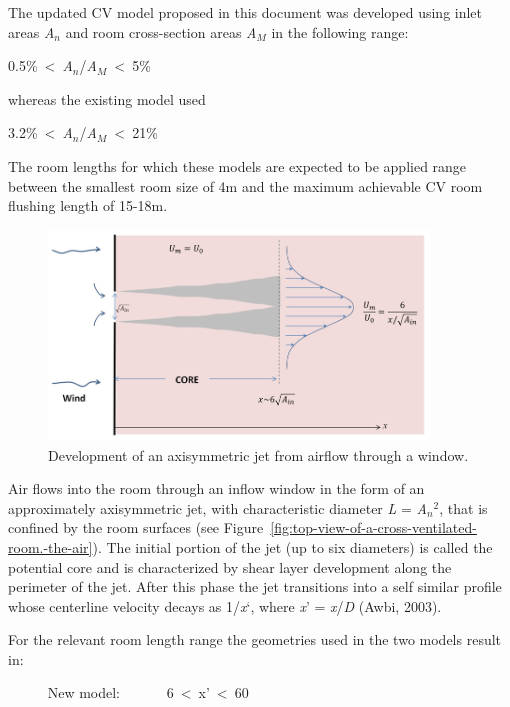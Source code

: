 The updated CV model proposed in this document was developed using inlet areas \emph{A}\(_{n}\) and room cross-section areas \emph{A}\(_{M}\) in the following range:

0.5\%~\textless{}~\emph{A}\(_{n}\)/\emph{A}\(_{M}\)~\textless{}~5\%

whereas the existing model used

3.2\%~\textless{}~\emph{A}\(_{n}\)/\emph{A}\(_{M}\)~\textless{}~21\%

The room lengths for which these models are expected to be applied range between the smallest room size of 4m and the maximum achievable CV room flushing length of 15-18m.

\begin{figure}[hbtp] %
\centering
\includegraphics[width=0.9\textwidth, height=0.9\textheight, keepaspectratio=true]{media/image2622.png}
\caption{Development of an axisymmetric jet from airflow through a window. \protect \label{fig:development-of-an-axisymmetric-jet-from}}
\end{figure}

Air flows into the room through an inflow window in the form of an approximately axisymmetric jet, with characteristic diameter \emph{L} = \emph{A}\(_{n}\)\(^{2}\), that is confined by the room surfaces (see Figure~\ref{fig:top-view-of-a-cross-ventilated-room.-the-air}). The initial portion of the jet (up to six diameters) is called the potential core and is characterized by shear layer development along the perimeter of the jet. After this phase the jet transitions into a self similar profile whose centerline velocity decays as 1/\emph{x}`, where \emph{x}' = \emph{x}/\emph{D} (Awbi, 2003).

For the relevant room length range the geometries used in the two models result in:

~~~~~ New model:~~~~~~ 6~\textless{}~x'~\textless{}~60

